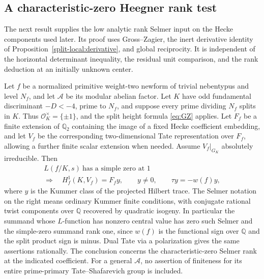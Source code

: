 \subsection{A characteristic-zero Heegner rank test}

The next result supplies the low analytic rank Selmer input on the Hecke components used later. Its proof uses Gross--Zagier, the inert derivative identity of Proposition~\ref{split-local:derivative}, and global reciprocity. It is independent of the horizontal determinant inequality, the residual unit comparison, and the rank deduction at an initially unknown center.

\begin{proposition}\label{split-local:heegner-rank}
Let \(f\) be a normalized primitive weight-two newform of trivial nebentypus and level \(N_f\), and let \(\mathcal A\) be its modular abelian factor. Let \(K\) have odd fundamental discriminant \(-D<-4\), prime to \(N_f\), and suppose every prime dividing \(N_f\) splits in \(K\). Thus \(\mathcal O_K^\times=\{\pm1\}\), and the split height formula \eqref{eq:GZ} applies. Let \(F_f\) be a finite extension of \(\mathbb Q_2\) containing the image of a fixed Hecke coefficient embedding, and let \(V_f\) be the corresponding two-dimensional Tate representation over \(F_f\), allowing a further finite scalar extension when needed. Assume \(V_f|_{G_K}\) absolutely irreducible. Then
\[
 \begin{gathered}
 L(f/K,s)\ \text{has a simple zero at }1\\
 \Longrightarrow\quad
 H^1_f(K,V_f)=F_f y,\qquad y\ne0,\qquad \tau y=-w(f)y,
                                                                    \tag{K0}\label{eq:K0}
 \end{gathered}
\]
where \(y\) is the Kummer class of the projected Hilbert trace. The Selmer notation on the right means ordinary Kummer finite conditions, with conjugate rational twist components over \(\mathbb Q\) recovered by quadratic isogeny. In particular the summand whose \(L\)-function has nonzero central value has zero such Selmer and the simple-zero summand rank one, since \(w(f)\) is the functional sign over \(\mathbb Q\) and the split product sign is minus. Dual Tate via a polarization gives the same assertions rationally. The conclusion concerns the characteristic-zero Selmer rank at the indicated coefficient. For a general \(\mathcal A\), no assertion of finiteness for its entire prime-primary Tate--Shafarevich group is included.
\end{proposition}

